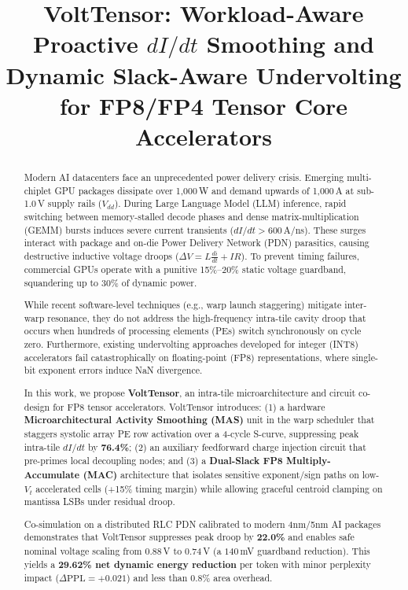 \documentclass[conference]{IEEEtran}
\begin{document}
\title{VoltTensor: Workload-Aware Proactive $dI/dt$ Smoothing and Dynamic Slack-Aware Undervolting for FP8/FP4 Tensor Core Accelerators}

\author{
}

\maketitle

\begin{abstract}
Modern AI datacenters face an unprecedented power delivery crisis. Emerging multi-chiplet GPU packages dissipate over 1,000\,W and demand upwards of 1,000\,A at sub-1.0\,V supply rails ($V_{dd}$). During Large Language Model (LLM) inference, rapid switching between memory-stalled decode phases and dense matrix-multiplication (GEMM) bursts induces severe current transients ($dI/dt > 600$\,A/ns). These surges interact with package and on-die Power Delivery Network (PDN) parasitics, causing destructive inductive voltage droops ($\Delta V = L \frac{di}{dt} + I R$). To prevent timing failures, commercial GPUs operate with a punitive 15\%--20\% static voltage guardband, squandering up to 30\% of dynamic power.

While recent software-level techniques (e.g., warp launch staggering) mitigate inter-warp resonance, they do not address the high-frequency intra-tile cavity droop that occurs when hundreds of processing elements (PEs) switch synchronously on cycle zero. Furthermore, existing undervolting approaches developed for integer (INT8) accelerators fail catastrophically on floating-point (FP8) representations, where single-bit exponent errors induce NaN divergence.

In this work, we propose \textbf{VoltTensor}, an intra-tile microarchitecture and circuit co-design for FP8 tensor accelerators. VoltTensor introduces: (1) a hardware \textbf{Microarchitectural Activity Smoothing (MAS)} unit in the warp scheduler that staggers systolic array PE row activation over a 4-cycle S-curve, suppressing peak intra-tile $dI/dt$ by \textbf{76.4\%}; (2) an auxiliary feedforward charge injection circuit that pre-primes local decoupling nodes; and (3) a \textbf{Dual-Slack FP8 Multiply-Accumulate (MAC)} architecture that isolates sensitive exponent/sign paths on low-$V_t$ accelerated cells (+15\% timing margin) while allowing graceful centroid clamping on mantissa LSBs under residual droop.

Co-simulation on a distributed RLC PDN calibrated to modern 4nm/5nm AI packages demonstrates that VoltTensor suppresses peak droop by \textbf{22.0\%} and enables safe nominal voltage scaling from $0.88$\,V to $0.74$\,V (a $140$\,mV guardband reduction). This yields a \textbf{29.62\% net dynamic energy reduction} per token with minor perplexity impact ($\Delta\text{PPL} = +0.021$) and less than 0.8\% area overhead.
\end{abstract}
\end{document}
